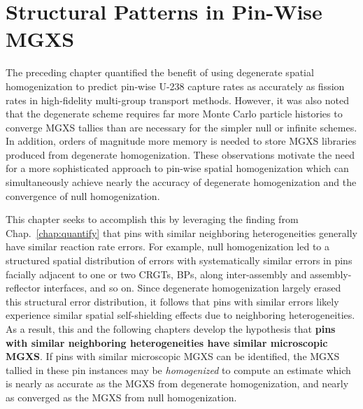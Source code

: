 \chapter{Structural Patterns in Pin-Wise MGXS}
\label{chap:spatial}

The preceding chapter quantified the benefit of using degenerate spatial homogenization to predict pin-wise U-238 capture rates as accurately as fission rates in high-fidelity multi-group transport methods. However, it was also noted that the degenerate scheme requires far more Monte Carlo particle histories to converge \ac{MGXS} tallies than are necessary for the simpler null or infinite schemes. In addition, orders of magnitude more memory is needed to store \ac{MGXS} libraries produced from degenerate homogenization. These observations motivate the need for a more sophisticated approach to pin-wise spatial homogenization which can simultaneously achieve nearly the accuracy of degenerate homogenization and the convergence of null homogenization.

This chapter seeks to accomplish this by leveraging the finding from Chap.~\ref{chap:quantify} that pins with similar neighboring heterogeneities generally have similar reaction rate errors. For example, null homogenization led to a structured spatial distribution of errors with systematically similar errors in pins facially adjacent to one or two \acp{CRGT}, \acp{BP}, along inter-assembly and assembly-reflector interfaces, and so on. Since degenerate homogenization largely erased this structural error distribution, it follows that pins with similar errors likely experience similar spatial self-shielding effects due to neighboring heterogeneities. As a result, this and the following chapters develop the hypothesis that \textbf{pins with similar neighboring heterogeneities have similar microscopic \ac{MGXS}}. If pins with similar microscopic \ac{MGXS} can be identified, the \ac{MGXS} tallied in these pin instances may be \textit{homogenized} to compute an estimate which is nearly as accurate as the \ac{MGXS} from degenerate homogenization, and nearly as converged as the \ac{MGXS} from null homogenization. 

